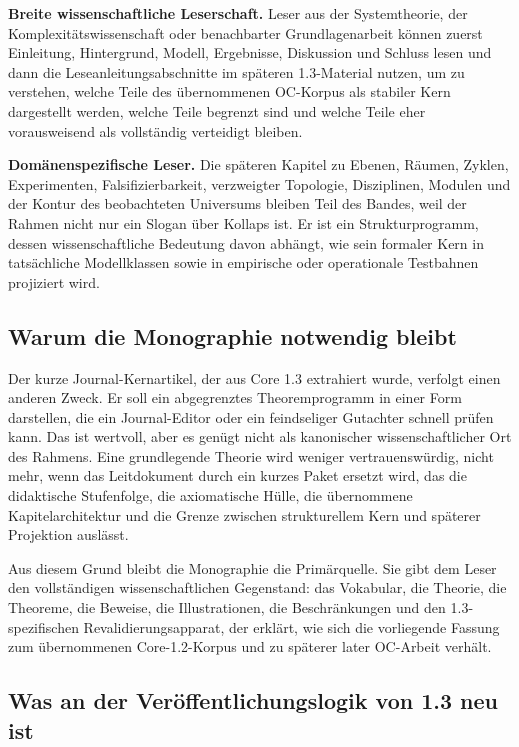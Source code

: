 \textbf{Breite wissenschaftliche Leserschaft.}
Leser aus der Systemtheorie, der Komplexitätswissenschaft oder benachbarter Grundlagenarbeit
können zuerst Einleitung, Hintergrund, Modell, Ergebnisse, Diskussion und Schluss lesen und dann
die Leseanleitungsabschnitte im späteren 1.3-Material nutzen, um zu verstehen, welche Teile des
übernommenen OC-Korpus als stabiler Kern dargestellt werden, welche Teile begrenzt sind und
welche Teile eher vorausweisend als vollständig verteidigt bleiben.

\textbf{Domänenspezifische Leser.}
Die späteren Kapitel zu Ebenen, Räumen, Zyklen, Experimenten, Falsifizierbarkeit, verzweigter
Topologie, Disziplinen, Modulen und der Kontur des beobachteten Universums bleiben Teil des
Bandes, weil der Rahmen nicht nur ein Slogan über Kollaps ist. Er ist ein Strukturprogramm,
dessen wissenschaftliche Bedeutung davon abhängt, wie sein formaler Kern in tatsächliche
Modellklassen sowie in empirische oder operationale Testbahnen projiziert wird.

\subsection{Warum die Monographie notwendig bleibt}

Der kurze Journal-Kernartikel, der aus Core 1.3 extrahiert wurde, verfolgt einen anderen Zweck.
Er soll ein abgegrenztes Theoremprogramm in einer Form darstellen, die ein Journal-Editor oder
ein feindseliger Gutachter schnell prüfen kann. Das ist wertvoll, aber es genügt nicht als
kanonischer wissenschaftlicher Ort des Rahmens. Eine grundlegende Theorie wird weniger
vertrauenswürdig, nicht mehr, wenn das Leitdokument durch ein kurzes Paket ersetzt wird, das die
didaktische Stufenfolge, die axiomatische Hülle, die übernommene Kapitelarchitektur und die
Grenze zwischen strukturellem Kern und späterer Projektion auslässt.

Aus diesem Grund bleibt die Monographie die Primärquelle. Sie gibt dem Leser den vollständigen
wissenschaftlichen Gegenstand: das Vokabular, die Theorie, die Theoreme, die Beweise, die
Illustrationen, die Beschränkungen und den 1.3-spezifischen Revalidierungsapparat, der erklärt,
wie sich die vorliegende Fassung zum übernommenen Core-1.2-Korpus und zu späterer later OC-Arbeit
verhält.

\subsection{Was an der Veröffentlichungslogik von 1.3 neu ist}

